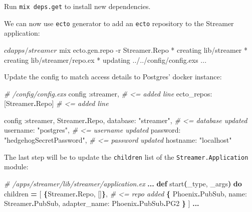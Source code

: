 \documentclass[
  oneside]{book}
\newenvironment{Shaded}{\begin{snugshade}}{\end{snugshade}}
\newcommand{\AttributeTok}[1]{\textcolor[rgb]{0.13,0.29,0.53}{#1}}
\newcommand{\CommentTok}[1]{\textcolor[rgb]{0.56,0.35,0.01}{\textit{#1}}}
\newcommand{\ConstantTok}[1]{\textcolor[rgb]{0.56,0.35,0.01}{#1}}
\newcommand{\ExtensionTok}[1]{#1}
\newcommand{\FunctionTok}[1]{\textcolor[rgb]{0.13,0.29,0.53}{\textbf{#1}}}
\newcommand{\KeywordTok}[1]{\textcolor[rgb]{0.13,0.29,0.53}{\textbf{#1}}}
\newcommand{\NormalTok}[1]{#1}
\newcommand{\OperatorTok}[1]{\textcolor[rgb]{0.81,0.36,0.00}{\textbf{#1}}}
\newcommand{\OtherTok}[1]{\textcolor[rgb]{0.56,0.35,0.01}{#1}}
\newcommand{\StringTok}[1]{\textcolor[rgb]{0.31,0.60,0.02}{#1}}
\newcommand{\VariableTok}[1]{\textcolor[rgb]{0.00,0.00,0.00}{#1}}
\begin{document}
Run \texttt{mix\ deps.get} to install new dependencies.

We can now use \texttt{ecto} generator to add an \texttt{ecto} repository to the Streamer application:

\begin{Shaded}
\begin{Highlighting}[]
\ExtensionTok{$}\NormalTok{ cd apps/streamer}
\ExtensionTok{$}\NormalTok{ mix ecto.gen.repo }\AttributeTok{{-}r}\NormalTok{ Streamer.Repo}
\ExtensionTok{*}\NormalTok{ creating lib/streamer}
\ExtensionTok{*}\NormalTok{ creating lib/streamer/repo.ex}
\ExtensionTok{*}\NormalTok{ updating ../../config/config.exs}
\ExtensionTok{...}
\end{Highlighting}
\end{Shaded}

Update the config to match access details to Postgres' docker instance:

\begin{Shaded}
\begin{Highlighting}[]
\CommentTok{\# /config/config.exs}
\NormalTok{config }\VariableTok{:streamer}\NormalTok{,             }\CommentTok{\# \textless{}= added line }
  \VariableTok{ecto\_repos:} \OtherTok{[}\ConstantTok{Streamer}\OperatorTok{.}\ConstantTok{Repo}\OtherTok{]} \CommentTok{\# \textless{}= added line}

\NormalTok{config }\VariableTok{:streamer}\NormalTok{, }\ConstantTok{Streamer}\OperatorTok{.}\ConstantTok{Repo}\NormalTok{,}
  \VariableTok{database:} \StringTok{"streamer"}\NormalTok{,               }\CommentTok{\# \textless{}= database updated }
  \VariableTok{username:} \StringTok{"postgres"}\NormalTok{,               }\CommentTok{\# \textless{}= username updated}
  \VariableTok{password:} \StringTok{"hedgehogSecretPassword"}\NormalTok{, }\CommentTok{\# \textless{}= password updated}
  \VariableTok{hostname:} \StringTok{"localhost"}
\end{Highlighting}
\end{Shaded}

The last step will be to update the \texttt{children} list of the \texttt{Streamer.Application} module:

\begin{Shaded}
\begin{Highlighting}[]
\CommentTok{\# /apps/streamer/lib/streamer/application.ex}
\OperatorTok{...}
  \KeywordTok{def}\NormalTok{ start}\FunctionTok{(}\NormalTok{\_type, \_args}\FunctionTok{)} \KeywordTok{do}
\NormalTok{    children }\OperatorTok{=} \OtherTok{[}
      \FunctionTok{\{}\ConstantTok{Streamer}\OperatorTok{.}\ConstantTok{Repo}\NormalTok{, }\OtherTok{[]}\FunctionTok{\}}\NormalTok{, }\CommentTok{\# \textless{}= repo added}
      \FunctionTok{\{}
        \ConstantTok{Phoenix}\OperatorTok{.}\ConstantTok{PubSub}\NormalTok{,}
        \VariableTok{name:} \ConstantTok{Streamer}\OperatorTok{.}\ConstantTok{PubSub}\NormalTok{, }\VariableTok{adapter\_name:} \ConstantTok{Phoenix}\OperatorTok{.}\ConstantTok{PubSub}\OperatorTok{.}\ConstantTok{PG2}
      \FunctionTok{\}}
    \OtherTok{]}
    \OperatorTok{...}
\end{Highlighting}
\end{Shaded}
\end{document}
